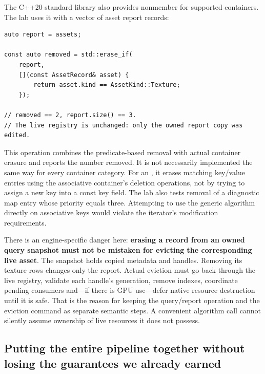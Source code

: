 The C++20 standard library also provides nonmember  for supported containers. The lab uses it with a vector of asset report records:

\begin{verbatim}
auto report = assets;

const auto removed = std::erase_if(
    report,
    [](const AssetRecord& asset) {
        return asset.kind == AssetKind::Texture;
    });

// removed == 2, report.size() == 3.
// The live registry is unchanged: only the owned report copy was edited.
\end{verbatim}

This operation combines the predicate-based removal with actual container erasure and reports the number removed. It is not necessarily implemented the same way for every container category. For an , it erases matching key/value entries using the associative container's deletion operations, not by trying to assign a new key into a const key field. The lab also tests removal of a diagnostic map entry whose priority equals three. Attempting to use the generic  algorithm directly on associative keys would violate the iterator's modification requirements.

There is an engine-specific danger here: \textbf{erasing a record from an owned query snapshot must not be mistaken for evicting the corresponding live asset}. The snapshot holds copied metadata and handles. Removing its texture rows changes only the report. Actual eviction must go back through the live registry, validate each handle's generation, remove indexes, coordinate pending consumers and---if there is GPU use---defer native resource destruction until it is safe. That is the reason for keeping the query/report operation and the eviction command as separate semantic steps. A convenient algorithm call cannot silently assume ownership of live resources it does not possess.

\subsection{Putting the entire pipeline together without losing the guarantees we already earned}\label{05-engine-i-ch006-putting-the-entire-pipeline-together-without-losing-the-guarantees-we-already-earned}


